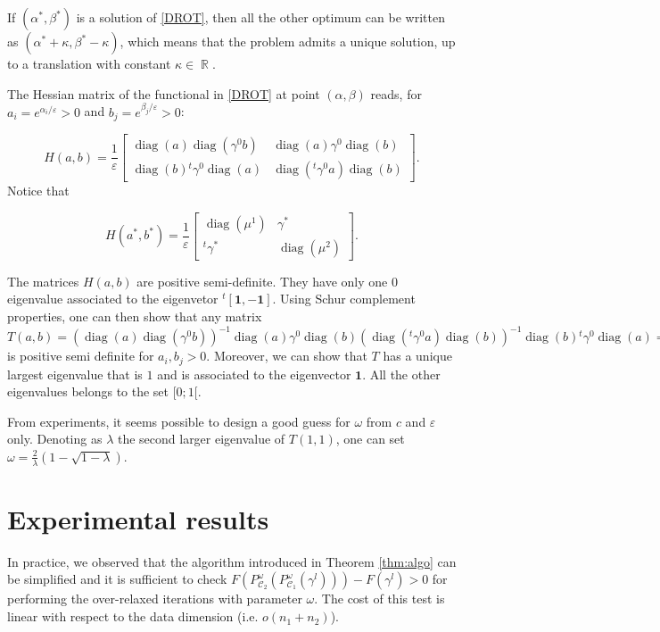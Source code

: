 \documentclass{article} %
\DeclareMathOperator{\IR}{\mathbb{R}}
\DeclareMathOperator{\Ccal}{\mathcal{C}}
\DeclareMathOperator{\diag}{diag}
\renewcommand{\epsilon}{\varepsilon}
\theoremstyle{plain}
\theoremstyle{definition}
\theoremstyle{remark}
\begin{document}
If $(\alpha^*,\beta^*)$ is a solution of \eqref{DROT}, then all the 
other optimum can be written as $(\alpha^*+\kappa,\beta^*-\kappa)$, which means that the problem admits a unique solution, up to a translation with constant $\kappa\in\IR$.


The Hessian matrix of the functional in \eqref{DROT} at point $(\alpha,\beta)$ reads, for $a_i=e^{\alpha_i/\epsilon}>0$ and $b_j=e^{\beta_j/\epsilon}>0$:


$$H(a,b)=\frac1\epsilon\begin{bmatrix}
\diag(a)\diag(\gamma^0 b)&\diag(a)\gamma^0 \diag(b)\\
\diag(b){^t\gamma^0} \diag(a)&\diag(^t\gamma^0a)\diag(b)
\end{bmatrix}.$$
Notice that 

$$H(a^*,b^*)=\frac1\epsilon\begin{bmatrix}
\diag(\mu^1)&\gamma^*\\
^t\gamma^*&\diag(\mu^2)
\end{bmatrix}.$$


The matrices $H(a,b)$  are positive semi-definite. They have only one $0$ eigenvalue associated to the eigenvetor $^t[\mathbf{1},-\mathbf{1}]$. 
Using Schur complement properties, one can then show that any matrix $T(a,b)=(\diag(a)\diag(\gamma^0 b))^{-1}\diag(a)\gamma^0\diag(b)(\diag(^t\gamma^0a)\diag(b))^{-1} \diag(b){^t\gamma^0}\diag(a)=(\diag(\gamma^0 b))^{-1}\gamma^0(\diag(^t\gamma^0a))^{-1} \diag(b){^t\gamma^0}\diag(a)$ is positive semi definite for $a_i,b_j>0$. Moreover, we can show that $T$ has a unique largest eigenvalue that is $1$ and is associated to the eigenvector $\mathbf{1}$. All the other eigenvalues belongs to the set $[0;1[$.


From experiments, it seems possible to design a good guess for $\omega$ from $c$ and $\epsilon$ only. 
    Denoting as $\lambda$ the second larger eigenvalue of $T(1,1)$, one can set 
    $\omega=\frac{2}{\lambda}(1-\sqrt{1-\lambda})$.
    
    
    
\section{Experimental results}


In practice, we observed that the algorithm introduced in Theorem \ref{thm:algo} can be simplified and it is sufficient to check $F(P^\omega_{\Ccal_2}(P^\omega_{\Ccal_1}(\gamma^l)))-F(\gamma^l)>0$ for performing the over-relaxed iterations with parameter $\omega$.
The cost of this test is linear with respect to the data dimension (i.e. $o(n_1+n_2)$).
\end{document}
